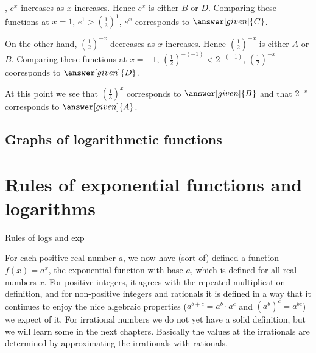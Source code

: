 \documentclass{ximera}
\begin{document}
\begin{example}
\begin{explanation}
\begin{image}
    \end{image}
    , $e^x$ increases as $x$
    increases. Hence $e^x$ is either $B$ or $D$. Comparing these
    functions at $x=1$, $e^1> \left(\frac{1}{3}\right)^1$, $e^x$
    corresponds to $\answer[given]{C}$.

    On the other hand, $\left(\frac{1}{2}\right)^{-x}$ decreases as
    $x$ increases. Hence $\left(\frac{1}{2}\right)^{-x}$ is either $A$
    or $B$. Comparing these functions at $x=-1$,
    $\left(\frac{1}{2}\right)^{-(-1)}< 2^{-(-1)}$,
    $\left(\frac{1}{2}\right)^{-x}$ cooresponds to
    $\answer[given]{D}$.

    At this point we see that $\left(\frac{1}{3}\right)^{x}$
    corresponds to $\answer[given]{B}$ and that $2^{-x}$ corresponds
    to $\answer[given]{A}$.
  \end{explanation}
\end{example}



\subsection{Graphs of logarithmetic functions}


\begin{example}
\end{example}

\section{Rules of exponential functions and logarithms}
Rules of logs and exp

For each positive real number $a$, we now have (sort of) defined a
function $f(x) = a^x$, the exponential function with base $a$, which
is defined for all real numbers $x$.  For positive integers, it agrees
with the repeated multiplication definition, and for non-positive
integers and rationals it is defined in a way that it continues to
enjoy the nice algebraic properties ($a^{b+c} = a^b \cdot a^c$ and
$(a^b)^c = a^{bc}$) we expect of it.  For irrational numbers we do not
yet have a solid definition, but we will learn some in the next
chapters.  Basically the values at the irrationals are determined by
approximating the irrationals with rationals.
\end{document}
